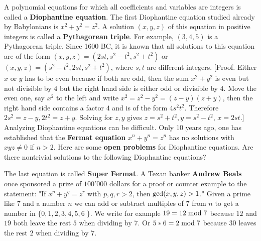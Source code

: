 \documentclass[12pt]{amsart}
\newcounter{example}    \def\example#1{ \item \fontsize{12}{15} \selectfont #1 \fontsize{12}{15} \selectfont }
\begin{document}
A polynomial equations for which all coefficients and variables are integers is called
a {\bf Diophantine equation}. The first Diophantine equation studied already by Babylonians is
$x^2 +y^2 = z^2$. A solution $(x,y,z)$ of this equation in positive integers is called a 
{\bf Pythagorean triple}. For example, $(3,4,5)$ is a Pythagorean triple.
Since 1600 BC, it is known that all solutions to this equation are of the form $(x,y,z) =(2st,s^2-t^2,s^2+t^2)$ or 
$(x,y,z) =(s^2-t^2,2 s t,s^2+t^2)$, where $s,t$ are different integers. 
[Proof. Either $x$ or $y$ has to be even because if both are odd, then the sum $x^2+y^2$
is even but not divisible by $4$ but the right hand side is either odd or divisible by $4$. 
Move the even one, say $x^2$ to the left and write $x^2= z^2-y^2 = (z-y) (z+y)$, 
then the right hand side contains a factor $4$ and is of the form $4s^2 t^2$. Therefore
$2s^2 = z-y, 2t^2 = z+y$. Solving for $z,y$ gives $z = s^2+t^2,
y=s^2-t^2$, $x=2st$.] \\
Analyzing Diophantine equations can be difficult. Only 10 years ago, one has established that
the {\bf Fermat equation} $x^n+y^n=z^n$ has no solutions with $xyz \neq 0$ if $n>2$. 
Here are some {\bf open problems} for Diophantine equations. 
Are there nontrivial solutions to the following Diophantine equations?
\begin{center}
 \end{center}
The last equation is called {\bf Super Fermat}.
A Texan banker {\bf Andrew Beals} once sponsored a prize of $100'000$ 
dollars for a proof or counter example to the statement:
"If $x^p+y^q = z^r$ with $p,q,r>2$, then ${\rm gcd}(x,y,z)>1$." 
Given a prime like $7$ and a number $n$ we can add or subtract multiples
of $7$ from $n$ to get a number in $\{0,1,2,3,4,5,6 \; \}$. We write for example $19 = 12 \; {\rm mod} \; 7$
because $12$ and $19$ both leave the rest $5$ when dividing by $7$. 
Or $5*6 = 2 \; {\rm mod} \; 7$ because $30$ leaves the rest $2$ when dividing by $7$.
\end{document}
